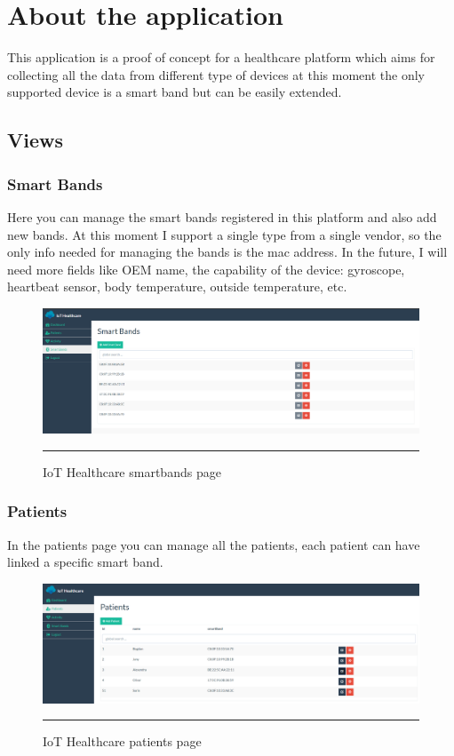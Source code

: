 \section{About the application}

This application is a proof of concept for a healthcare platform which aims for collecting all the data from different type of devices at this moment the only supported device is a smart band but can be easily extended.

\subsection{Views}

\subsubsection{Smart Bands}
Here you can manage the smart bands registered in this platform and also add new bands. At this moment I support a single type from a single vendor, so the only info needed for managing the bands is the mac address. In the future, I will need more fields like OEM name, the capability of the device: gyroscope, heartbeat sensor, body temperature,  outside temperature, etc.
\begin{figure}[h!]
	\centering
	\includegraphics[width=1\textwidth]{./images/iothsmartbands}
	\rule{1\textwidth}{1pt}
	\caption{IoT Healthcare smartbands page}
\end{figure}


\subsubsection{Patients}
In the patients page you can manage all the patients, each patient can have linked a specific smart band.

\begin{figure}[h!]
	\centering
	\includegraphics[width=1\textwidth]{./images/iothpatient}
	\rule{1\textwidth}{1pt}
	\caption{IoT Healthcare patients page}
\end{figure}

